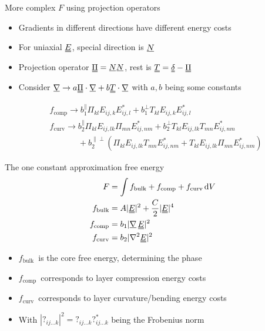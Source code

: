 \documentclass[10pt,mathserif]{beamer}
\newcommand{\suf}[2]{\stackunder[0.5pt]{\stackunder[1pt]{\ensuremath{#1}}{\rule{\widthof{\ensuremath{#2}}*\real{0.9}}{.1ex}}}{}}
\newcommand{\duf}[2]{\stackunder[0.5pt]{\stackunder[0.8pt]{\stackunder[1pt]{\ensuremath{#1}}{\rule{\widthof{\ensuremath{#2}}*\real{0.9}}{.1ex}}}{\rule{\widthof{\ensuremath{#2}}*\real{0.9}}{.1ex}}}{}}
\newcommand{\su}[1]{\suf{#1}{#1}}
\newcommand{\du}[1]{\duf{#1}{#1}}
\newcommand{\mgrad}{\ensuremath{\suf{\nabla}{K}\,}}
\newcommand{\EE}{\ensuremath{\du{E}}}
\newcommand{\FB}{\ensuremath{f_\text{bulk}}}
\newcommand{\FC}{\ensuremath{f_\text{comp}}}
\newcommand{\FU}{\ensuremath{f_\text{curv}}}
\newcommand{\onedot}{$\mathsurround0pt\ldotp$}
\newcommand{\cddot}{\mathbin{
    \vcenter{\baselineskip1ex \vspace{-0.1ex}\hbox{\onedot}\hbox{\onedot}}
}}
\newcommand{\extra}[1]{\color{gray} #1 \normalcolor}
\begin{document}
\begin{frame}[fragile]{More complex $F$ using projection operators}
    \newrefsection
    \begin{itemize}
        \item Gradients in different directions have different energy costs
        \item For uniaxial \EE, special direction is $\su{N}$
        \item Projection operator $\du{\Pi}=\su{N}\su{N}$, rest is $\du{T} = \du{\delta} - \du{\Pi}$
        \extra{\item Consider $\su{\nabla} \rightarrow a \du{\Pi}\cdot\su{\nabla} + b \du{T}\cdot\su{\nabla}$ with $a, b$ being some constants}
    \end{itemize}

    \begin{align*}
        &f_\text{comp} \rightarrow b_1^\parallel \Pi_{kl} E_{ij,k}E_{ij,l}^* + b_1^\perp T_{kl} E_{ij,k}E_{ij,l}^* \\
        &f_\text{curv} \rightarrow b_2^\parallel \Pi_{kl}E_{ij,lk}\Pi_{mn}E_{ij,nm}^* + b_2^\perp T_{kl}E_{ij,lk}T_{mn}E_{ij,nm}^* \\
        &\phantom{f_\text{curv} \rightarrow}+ b_2^{\parallel\perp}(\Pi_{kl}E_{ij,lk}T_{mn}E_{ij,nm}^* + T_{kl}E_{ij,lk}\Pi_{mn}E_{ij,nm}^*)
    \end{align*}

\end{frame}

\begin{frame}[fragile]{The one constant approximation free energy}
    \newrefsection
    \begin{align*}
        F &= \int f_\text{bulk} + f_\text{comp} + f_\text{curv} \dd{V} \\
        f_\text{bulk} &= A |\EE|^2 + \frac{C}{2} |\EE|^4 \\
        f_\text{comp} &= b_1 |\mgrad \EE|^2 \\
        f_\text{curv} &= b_2 |\nabla^2 \EE|^2
    \end{align*}
    \begin{itemize}
        \item \FB\ is the core free energy, determining the phase
        \item \FC\ corresponds to layer compression energy costs
        \item \FU\ corresponds to layer curvature/bending energy costs
        \extra{\item With $|?_{ij\ldots k}|^2=?_{ij\ldots k}?_{ij\ldots k}^*$ being the Frobenius norm}
    \end{itemize}
\end{frame}
\end{document}
